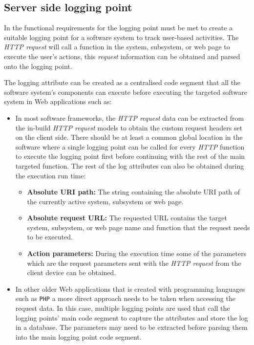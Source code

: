 \subsection{Server side logging point}\label{sec:ch2_serverSideLoggingpoint}
In  the functional requirements for the logging point must be met to create a suitable logging point for a software system to track user-based activities. The \textit{HTTP request} will call a function in the system, subsystem, or web page to execute the user's actions, this \textit{request} information can be obtained and parsed onto the logging point.\par The logging attribute can be created as a centralised code segment that all the software system's components can execute before executing the targeted software system in Web applications such as:

\begin{itemize}
	\item In most software frameworks, the \textit{HTTP request} data can be extracted from the in-build \textit{HTTP request} models to obtain the custom request headers set on the client side. There should be at least a common global location in the software where a single logging point can be called for every \textit{HTTP} function to execute the logging point first before continuing with the rest of the main targeted function. The rest of the log attributes can also be obtained during the execution run time:
	\begin{itemize}
		\item \textbf{Absolute URI path:} The string containing the absolute URI path of the currently active system, subsystem or web page. 
		\item \textbf{Absolute request URL:} The requested URL contains the target system, subsystem, or web page name and function that the request needs to be executed. 
		\item \textbf{Action parameters:} During the execution time some of the parameters which are the request parameters sent with the \textit{HTTP request} from the client device can be obtained.
	\end{itemize}
	\item In other older Web applications that is created with programming languages such as \texttt{PHP} a more direct approach needs to be taken when accessing the request data. In this case, multiple logging points are used that call the logging points' main code segment to capture the attributes and store the log in a database. The parameters may need to be extracted before parsing them into the main logging point code segment.
\end{itemize}

